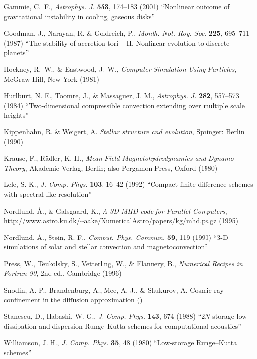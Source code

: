 \documentclass[\mydriver,12pt,twoside,notitlepage,a4paper]{article}
\begin{document}
\begin{thebibliography}{99}
Gammie, C.~F.,
  \emph{Astrophys. J.} \textbf{553}, 174--183 (2001)
  ``Nonlinear outcome of gravitational instability in cooling, gaseous disks''

Goodman, J., Narayan, R. \& Goldreich, P.,
  \emph{Month. Not. Roy. Soc.} \textbf{225}, 695--711 (1987)
  ``The stability of accretion tori -- II. Nonlinear evolution
  to discrete planets''

Hockney, R.~W., \& Eastwood, J.~W.,
  \emph{Computer Simulation Using Particles},
  McGraw-Hill, New York (1981)

Hurlburt, N. E., Toomre, J., \& Massaguer, J. M.,
  \emph{Astrophys. J.} \textbf{282}, 557--573 (1984)
  ``Two-dimensional compressible convection extending over multiple scale
  heights''

 Kippenhahn, R. \& Weigert, A.
  \emph{Stellar structure and evolution}, Springer: Berlin (1990)

 Krause, F., R\"adler, K.-H.,
  \emph{Mean-Field Magneto\-hy\-dro\-dy\-na\-mics and Dynamo Theory\/},
  Akademie-Verlag, Berlin; also Pergamon Press, Oxford (1980)

Lele, S. K.,
  \emph{J. Comp. Phys.} \textbf{103}, 16--42 (1992)
  ``Compact finite difference schemes with spectral-like resolution''

 Nordlund, \AA., \& Galsgaard, K.,
{\it A 3D MHD code for Parallel Computers},
{\url{http://www.astro.ku.dk/~aake/NumericalAstro/papers/kg/mhd.ps.gz}}
(1995)

 Nordlund, \AA., Stein, R. F.,
  \emph{Comput. Phys. Commun.} \textbf{59}, 119 (1990)
  ``3-D simulations of solar and stellar convection and magnetoconvection''

 Press, W., Teukolsky, S., Vetterling, W., \& Flannery, B.,
  \emph{Numerical Recipes in Fortran 90}, 2nd ed., Cambridge (1996)

Snodin, A. P., Brandenburg, A., Mee, A. J., \& Shukurov, A.
{Cosmic ray confinement in the diffusion approximation}
()

 Stanescu, D., Habashi, W. G.,
  \emph{J. Comp. Phys.} \textbf{143}, 674 (1988)
  ``$2N$-storage low dissipation and dispersion Runge--Kutta
  schemes for computational acoustics''

 Williamson, J. H.,
  \emph{J. Comp. Phys.} \textbf{35}, 48 (1980)
  ``Low-storage Runge--Kutta schemes''

\end{thebibliography}
\end{document}
